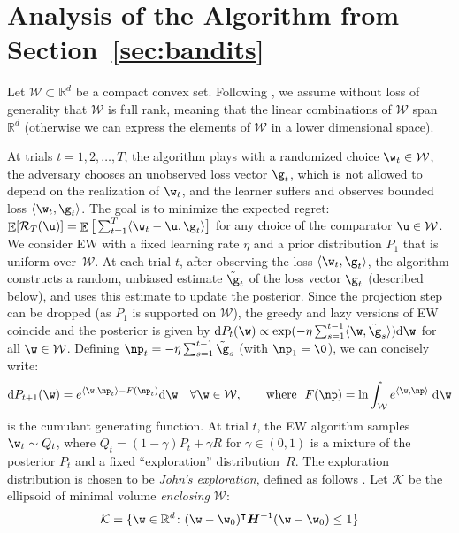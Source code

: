 \documentclass{colt2018} %
\DeclareMathOperator*{\E}{\mathbb{E}}
\renewcommand{\top}{\intercal}
\newcommand{\reals}{\mathbb{R}}
\newcommand{\domainw}{\mathcal{W}}
\newcommand{\inner}[2]{\langle #1, #2 \rangle}  %
\newcommand{\der}{\mathrm{d}}                   %
\newcommand{\regret}{\mathcal{R}}
\begin{document}
\section{Analysis of the Algorithm from Section~\ref{sec:bandits}}
\label{sec:appendix_bandits}
Let $\domainw \subset \reals^d$ be a compact convex set. Following
\citet{Bubeck12}, we assume without loss of generality that $\domainw$
is full rank, meaning that the linear combinations of $\domainw$ span
$\reals^d$ (otherwise we can express the elements of $\domainw$ in a
lower dimensional space). 

At trials
$t=1,2,\ldots,T$, the algorithm plays with a randomized choice $\w_t \in \domainw$, the
adversary chooses
an unobserved loss vector $\g_t$, which is not allowed to depend on the
realization of $\w_t$,
and the learner suffers and observes 
bounded loss $\inner{\w_t}{\g_t}$.
The goal is to minimize the expected regret:
$\E[\regret_T(\u)] = \E\big[\sum_{t=1}^T \inner{\w_t-\u}{\g_t} \big]$ for any
choice of the comparator $\u \in \domainw$.
We consider EW with a fixed learning rate $\eta$
and a prior distribution $P_1$ that is uniform over~$\domainw$.
At each trial $t$, after observing the loss $\inner{\w_t}{\g_t}$, the algorithm
constructs a random, unbiased estimate $\tilde{\g}_t$ of the loss vector $\g_t$
(described below), and uses this estimate to update the posterior. 
Since the projection step can be dropped (as $P_1$ is supported
on $\domainw$), the greedy and lazy versions of EW coincide and the posterior is given by 
$\der P_t(\w) \propto \exp(-\eta \sum_{s = 1}^{t-1} \inner{\w}{\tilde{\g}_s})\der \w$ for
all $\w \in \domainw$. Defining $\np_t = -\eta \sum_{s=1}^{t-1} \tilde{\g}_s$
(with $\np_1 = \0$), we can concisely write: 
\[
  \der P_{t+1}(\w) = e^{\inner{\w}{\np_t} - F(\np_t)}\der \w \quad \forall \w \in \domainw,
  \qquad \text{where~~}
  F(\np) = \ln \int_{\domainw} e^{\inner{\w}{\np}} \; \mathrm{d} \w
\]
is the cumulant generating function. 
% 
% 
% 
At trial $t$,
the EW algorithm samples $\w_t \sim Q_t$, where $Q_t = (1-\gamma) P_t + \gamma R$
for $\gamma \in (0,1)$ is a mixture of the posterior 
$P_t$ and a fixed ``exploration'' distribution~$R$.
The exploration distribution is chosen to be \emph{John's exploration}, defined
as follows \citep{Bubeck12}.
% 
% 
% 
% 
% 
% 
% 
% 
% 
% 
% 
% 
% 
% 
% 
% 
% 
% 
% 
% 
% 
% 
% 
% 
% 
% 
Let $\mathcal{K}$ be the
ellipsoid of minimal volume \emph{enclosing} $\domainw$:
\begin{equation}
  \mathcal{K} = \{\w \in \reals^d \colon (\w-\w_0)^\top \boldsymbol{H}^{-1} (\w-\w_0)
  \leq 1\}
  \label{eq:ellipsoid_E_of_minimal_volume}
\end{equation}
\end{document}
